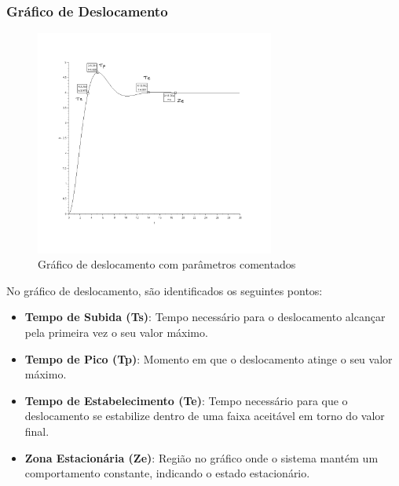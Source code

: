 \subsubsection{Gráfico de Deslocamento}
\begin{figure}[H]
    \centering
    \includegraphics[width=0.7\textwidth]{2-atividade/assets/deslocamento-comentado.png}
    \caption{Gráfico de deslocamento com parâmetros comentados}
\end{figure}
No gráfico de deslocamento, são identificados os seguintes pontos:
\begin{itemize}
    \item \textbf{Tempo de Subida (Ts)}: Tempo necessário para o deslocamento alcançar pela primeira vez o seu valor máximo.
    \item \textbf{Tempo de Pico (Tp)}: Momento em que o deslocamento atinge o seu valor máximo.
    \item \textbf{Tempo de Estabelecimento (Te)}: Tempo necessário para que o deslocamento se estabilize dentro de uma faixa aceitável em torno do valor final.
    \item \textbf{Zona Estacionária (Ze)}: Região no gráfico onde o sistema mantém um comportamento constante, indicando o estado estacionário.
\end{itemize}

